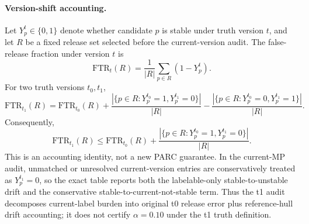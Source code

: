 \paragraph{Version-shift accounting.}
Let \(Y_p^{t}\in\{0,1\}\) denote whether candidate \(p\) is stable under
truth version \(t\), and let \(R\) be a fixed release set selected before the
current-version audit. The false-release fraction under version \(t\) is
\[
\mathrm{FTR}_{t}(R)=\frac{1}{|R|}\sum_{p\in R}(1-Y_p^{t}).
\]
For two truth versions \(t_0,t_1\),
\[
\mathrm{FTR}_{t_1}(R)=\mathrm{FTR}_{t_0}(R)
+\frac{|\{p\in R:Y_p^{t_0}=1,Y_p^{t_1}=0\}|}{|R|}
-\frac{|\{p\in R:Y_p^{t_0}=0,Y_p^{t_1}=1\}|}{|R|}.
\]
Consequently,
\[
\mathrm{FTR}_{t_1}(R)\le
\mathrm{FTR}_{t_0}(R)
+\frac{|\{p\in R:Y_p^{t_0}=1,Y_p^{t_1}=0\}|}{|R|}.
\]
This is an accounting identity, not a new PARC guarantee. In the current-MP
audit, unmatched or unresolved current-version entries are conservatively
treated as \(Y_p^{t_1}=0\), so the exact table reports both the labelable-only
stable-to-unstable drift and the conservative stable-to-current-not-stable term.
Thus the t1 audit decomposes current-label burden into original t0 release
error plus reference-hull drift accounting; it does not certify
\(\alpha=0.10\) under the t1 truth definition.
